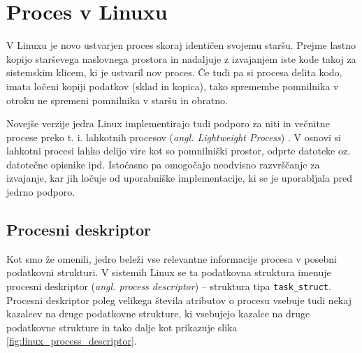 \documentclass[a4paper,12pt,openright]{book}
\begin{document}
\section{Proces v Linuxu}

V Linuxu je novo ustvarjen proces skoraj identičen svojemu staršu.
Prejme lastno kopijo starševega naslovnega prostora in nadaljuje z izvajanjem iste kode takoj za sistemskim klicem, ki je ustvaril nov proces.
Če tudi pa si procesa delita kodo, imata ločeni kopiji podatkov (sklad in kopica), tako spremembe pomnilnika v otroku ne spremeni pomnilnika v staršu in obratno.

Novejše verzije jedra Linux implementirajo tudi podporo za niti in večnitne procese preko t. i. lahkotnih procesov (\textit{angl. Lightweight Process}) \cite{Bovet_Cesati_2005}.
V osnovi si lahkotni procesi lahko delijo vire kot so pomnilniški prostor, odprte datoteke oz. datotečne opisnike ipd.
Istočasno pa omogočajo neodvisno razvrščanje za izvajanje, kar jih ločuje od uporabniške implementacije, ki se je uporabljala pred jedrno podporo.

\subsection{Procesni deskriptor}

Kot smo že omenili, jedro beleži vse relevantne informacije procesa v posebni podatkovni strukturi.
V sistemih Linux se ta podatkovna struktura imenuje procesni deskriptor (\textit{angl. process descriptor}) -- struktura tipa \texttt{task\_struct}.
Procesni deskriptor poleg velikega števila atributov o procesu vsebuje tudi nekaj kazalcev na druge podatkovne strukture, ki vsebujejo kazalce na druge podatkovne strukture in tako dalje kot prikazuje slika \ref{fig:linux_process_descriptor}.
\end{document}

